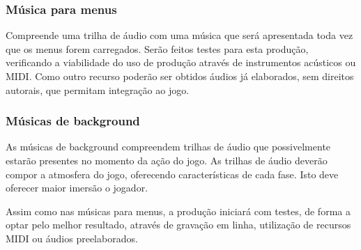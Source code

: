 \subsubsection{Música para menus}
Compreende uma trilha de áudio com uma música que será apresentada toda
 vez que os menus forem carregados. Serão feitos testes para esta produção, 
verificando a viabilidade do uso de produção através de instrumentos
 acústicos ou MIDI. Como outro recurso poderão ser obtidos áudios já
 elaborados, sem direitos autorais, que permitam integração ao jogo.

\subsubsection{Músicas de background}
As músicas de background compreendem trilhas de áudio que possivelmente
 estarão presentes no momento da ação do jogo. As trilhas de áudio 
deverão compor a atmosfera do jogo, oferecendo características de 
cada fase. Isto deve oferecer maior imersão o jogador.

Assim como nas músicas para menus, a produção iniciará com testes, de 
forma a optar pelo melhor resultado, através de gravação em linha,
 utilização de recursos MIDI ou áudios preelaborados.
